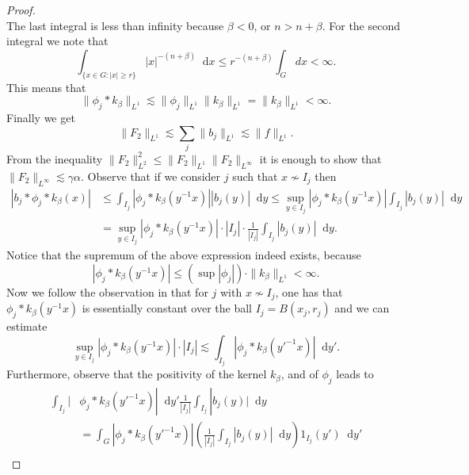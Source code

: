 \documentclass[12pt, reqno]{amsart}
\theoremstyle{definition}
\theoremstyle{remark}
\numberwithin{equation}{section}
\newcommand*\diff{\mathop{}\!\mathrm{d}}
\begin{document}
\begin{proof}
\begin{equation*}
\end{equation*}
The last integral is less than infinity because $\beta<0$, or $n>n+\beta$. For the second integral we note that
\begin{equation*}
    \int_{\{x\in G:|x|\geq r\}}|x|^{-(n+\beta)}\diff{x}\leq r^{-(n+\beta)}\int_{G}dx<\infty.
\end{equation*}
This means that
\begin{equation*}
    \|\phi_j*k_\beta\|_{L^1}\lesssim\|\phi_j\|_{L^1}\|k_\beta\|_{L^1}=\|k_\beta\|_{L^1}<\infty.
\end{equation*}
Finally we get
\begin{equation*}
    \|F_2\|_{L^1}\lesssim\sum_{j}\|b_j\|_{L^1}\lesssim\|f\|_{L^1}.
\end{equation*}
From the inequality $\|F_2\|^{2}_{L^2}\leq\|F_2\|_{L^1}\|F_2\|_{L^\infty}$ it is enough to show that $\|F_2\|_{L^\infty}\lesssim\gamma\alpha$. Observe that if we consider $j$ such that $x\not\sim I_j$ then
\begin{equation*}
\begin{aligned}
    |b_j*\phi_j*k_\beta(x)|&\leq\int_{I_j}|\phi_j*k_\beta(y^{-1}x)||b_j(y)|\diff{y}\leq\sup_{y\in I_j}|\phi_j*k_\beta(y^{-1}x)|\int_{I_j}|b_j(y)|\diff{y}\\
    &=\sup_{y\in I_j}|\phi_j*k_\beta(y^{-1}x)|\cdot|I_j|\cdot\frac{1}{|I_j|}\int_{I_j}|b_j(y)|\diff{y}.
\end{aligned}
\end{equation*}
Notice that the supremum of the above expression indeed exists, because
\begin{equation*}
    |\phi_j*k_\beta(y^{-1}x)|\leq(\sup|\phi_j|)\cdot\|k_\beta\|_{L^1}<\infty.
\end{equation*}
Now we follow the observation in \cite[Page 15]{5} that for $j$ with $x\not\sim I_j$, one has  that $\phi_j*k_\beta(y^{-1}x)$ is essentially constant over the ball $I_j=B(x_j,r_j)$ and we can estimate
\begin{equation*}
    \sup_{y\in I_j}|\phi_j*k_\beta(y^{-1}x)|\cdot|I_j|\lesssim\int_{I_j}|\phi_j*k_\beta(y'^{-1}x)|\diff{y'}.
\end{equation*}
Furthermore, observe that the positivity of the kernel $k_\beta$, and of $\phi_j$ leads to
\begin{equation*}
\begin{aligned}
    \int_{I_j}|&\phi_j*k_\beta(y'^{-1}x)|\diff{y'}\frac{1}{|I_j|}\int_{I_j}|b_j(y)|\diff{y}\\
    &=\int_{G}|\phi_j*k_\beta(y'^{-1}x)|\left(\frac{1}{|I_j|}\int_{I_j}|b_j(y)|\diff{y}\right)1_{I_j}(y')\diff{y'}\\

\end{aligned}
\end{equation*}
\end{proof}
\end{document}
